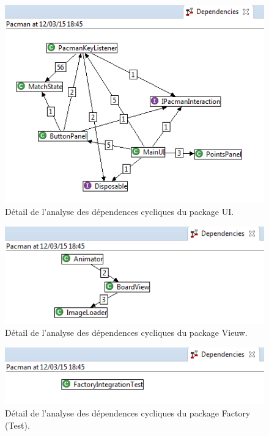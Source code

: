 \documentclass[12pt,a4paper,final]{article}
\begin{document}
\begin{figure}
	\centering
	\includegraphics[width=\textwidth]{images/DependenciesUI.png}
	\caption{\label{deadcode}Détail de l'analyse des dépendences cycliques du package UI.}
\end{figure}

\begin{figure}
	\centering
	\includegraphics[width=\textwidth]{images/DependenciesVieuw.png}
	\caption{\label{deadcode}Détail de l'analyse des dépendences cycliques du package Vieuw.}
\end{figure}

\begin{figure}
	\centering
	\includegraphics[width=\textwidth]{images/DependenciesFactoryTest.png}
	\caption{\label{deadcode}Détail de l'analyse des dépendences cycliques du package Factory (Test).}
\end{figure}
\end{document}
